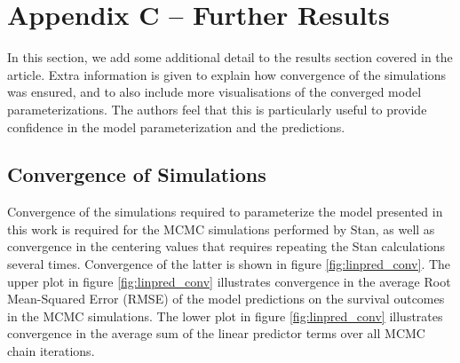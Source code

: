 \documentclass[
]{article}
\begin{document}
\newpage

\hypertarget{appendix-c-further-results}{%
\section{Appendix C -- Further Results}\label{appendix-c-further-results}}

In this section, we add some additional detail to the results section covered in the article. Extra information is given to explain how convergence of the simulations was ensured, and to also include more visualisations of the converged model parameterizations. The authors feel that this is particularly useful to provide confidence in the model parameterization and the predictions.

\hypertarget{convergence-of-simulations}{%
\subsection{Convergence of Simulations}\label{convergence-of-simulations}}

Convergence of the simulations required to parameterize the model presented in this work is required for the MCMC simulations performed by Stan, as well as convergence in the centering values that requires repeating the Stan calculations several times. Convergence of the latter is shown in figure \ref{fig:linpred_conv}. The upper plot in figure \ref{fig:linpred_conv} illustrates convergence in the average Root Mean-Squared Error (RMSE) of the model predictions on the survival outcomes in the MCMC simulations. The lower plot in figure \ref{fig:linpred_conv} illustrates convergence in the average sum of the linear predictor terms over all MCMC chain iterations.
\end{document}
